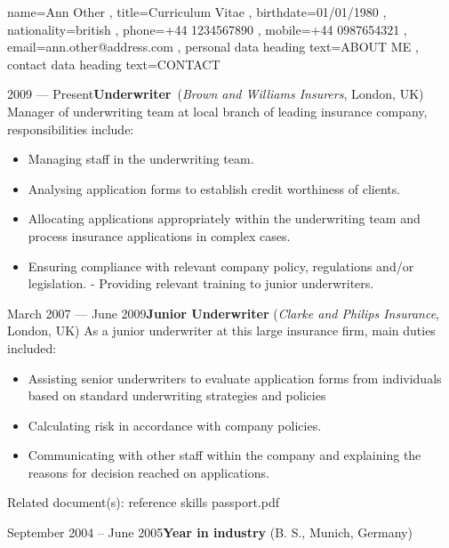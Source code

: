 \documentclass[a4paper, 12pt]{classycv}
\begin{document}
\begin{Resume}{%
	name=Ann Other%
	, title=Curriculum Vitae%
	, birthdate={01/01/1980}%
	, nationality=british%
	, phone=+44 1234567890%
	, mobile=+44 0987654321%
	, email=ann.\-other\-@ad\-dress.\-com%
	, personal data heading text={\MakeUppercase{About Me}}
	, contact data heading text={\MakeUppercase{Contact}}
}
%
%
%
\begin{Entry}[skip above=2em]{2009 --- Present}{\textbf{Underwriter}~(\textit{Brown and Williams Insurers}, London, UK)}
Manager of underwriting team at local branch of leading insurance company, responsibilities include:
	\begin{itemize}
		\item Managing staff in the underwriting team.
		\item Analysing application forms to establish credit worthiness of clients.
		\item Allocating applications appropriately within the underwriting team and process insurance applications in complex cases.
		\item Ensuring compliance with relevant company policy, regulations and/or legislation. - Providing relevant training to junior underwriters.
	\end{itemize}
\end{Entry}
%
\begin{Entry}[skip above=2em]{March 2007 --- June 2009}{\textbf{Junior Underwriter} (\textit{Clarke and Philips Insurance}, London, UK)}
As a junior underwriter at this large insurance firm, main duties included:
\begin{itemize}
	\item Assisting senior underwriters to evaluate application forms from individuals based on standard underwriting strategies and policies
	\item Calculating risk in accordance with company policies.
	\item Communicating with other staff within the company and explaining the reasons for decision reached on applications.
\end{itemize}%
\hspace*{\fill}\textcolor{accent-background}{Related document(s):} reference skills passport.pdf
\end{Entry}
%
\begin{Entry}[skip above=2em]{September 2004 – June 2005}{\textbf{Year in industry} (B. S., Munich, Germany)}

\end{Entry}
\end{Resume}
\end{document}
